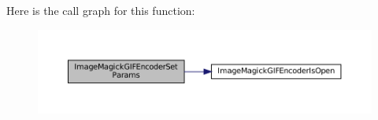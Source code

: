 Here is the call graph for this function\+:
\nopagebreak
\begin{figure}[H]
\begin{center}
\leavevmode
\includegraphics[width=350pt]{imagemagick-gif-encoder_8c_a40b53230d8a8b3b36048085d06d9d029_cgraph}
\end{center}
\end{figure}

